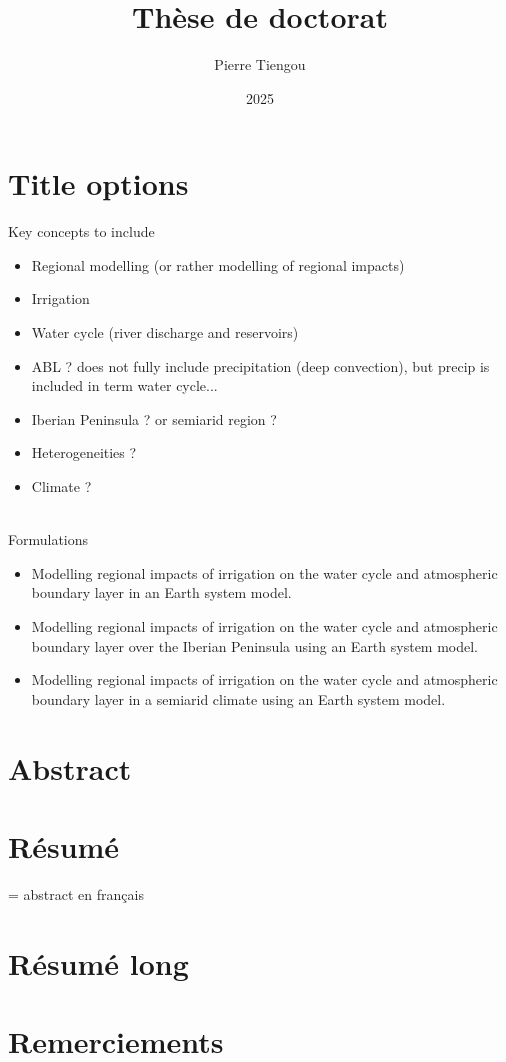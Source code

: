 \documentclass{report}
\begin{document}
\section*{Title options}
    Key concepts to include
    \begin{itemize}
        \item Regional modelling (or rather modelling of regional impacts)
        \item Irrigation
        \item Water cycle (river discharge and reservoirs)
        \item ABL ? does not fully include precipitation (deep convection), but precip is included in term water cycle...
        \item Iberian Peninsula ? or semiarid region ? 
        \item Heterogeneities ?
        \item Climate ?
    \end{itemize}
    \hfill
    \\
    Formulations
    \begin{itemize}
        \item Modelling regional impacts of irrigation on the water cycle and atmospheric boundary layer in an Earth system model.
        \item Modelling regional impacts of irrigation on the water cycle and atmospheric boundary layer over the Iberian Peninsula using an Earth system model.
        \item Modelling regional impacts of irrigation on the water cycle and atmospheric boundary layer in a semiarid climate using an Earth system model.
    \end{itemize}


\title{Thèse de doctorat}
\author{Pierre Tiengou }
\date{2025}
\maketitle

\section*{Abstract}
\section*{Résumé}
= abstract en français
\section*{Résumé long}
\section*{Remerciements}

\clearpage
\dominitoc
\renewcommand*\contentsname{Contents}
\tableofcontents
\newpage

% 


% 
% 
% 

\newpage

\printbibliography

\listoffigures
\newpage
\listoftables
\end{document}
